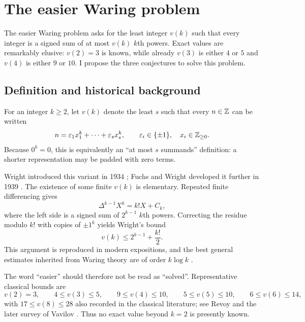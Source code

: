 \documentclass[../Axiomathic.tex]{subfiles}
\begin{document}
\chapter{The easier Waring problem}
The easier Waring problem asks for the least integer $v(k)$ such that every integer is a signed sum of at most $v(k)$ $k$th powers.  Exact values are remarkably elusive: $v(2)=3$ is known, while already $v(3)$ is either $4$ or $5$ and $v(4)$ is either $9$ or $10$.  I propose the three conjectures to solve this problem. 

\section{Definition and historical background}

For an integer $k\ge2$, let $v(k)$ denote the least $s$ such that every $n\in\mathbb Z$ can be written
\begin{equation}\label{eq:def-v}
  n=\varepsilon_1x_1^k+\cdots+\varepsilon_sx_s^k,
  \qquad \varepsilon_i\in\{\pm1\},\quad x_i\in\mathbb Z_{\ge0}.
\end{equation}
Because $0^k=0$, this is equivalently an ``at most $s$ summands'' definition: a shorter representation may be padded with zero terms.

Wright introduced this variant in 1934 \cite{Wright1934}; Fuchs and Wright developed it further in 1939 \cite{FuchsWright1939}.  The existence of some finite $v(k)$ is elementary.  Repeated finite differencing gives
\[
  \Delta^{k-1}X^k=k!X+C_k,
\]
where the left side is a signed sum of $2^{k-1}$ $k$th powers.  Correcting the residue modulo $k!$ with copies of $\pm1^k$ yields Wright's bound
\begin{equation}\label{eq:wright-elementary}
  v(k)\le 2^{k-1}+\frac{k!}{2}.
\end{equation}
This argument is reproduced in modern expositions, and the best general estimates inherited from Waring theory are of order $k\log k$ \cite{Borwein2002,Vavilov2022}.

The word ``easier'' should therefore not be read as ``solved''.  Representative classical bounds are
\begin{equation}\label{eq:known-small}
  v(2)=3,\qquad
  4\le v(3)\le5,\qquad
  9\le v(4)\le10,\qquad
  5\le v(5)\le10,\qquad
  6\le v(6)\le14,
\end{equation}
with $17\le v(8)\le28$ also recorded in the classical literature; see Revoy \cite{Revoy1991} and the later survey of Vavilov \cite{Vavilov2022}.  Thus no exact value beyond $k=2$ is presently known.
\end{document}
